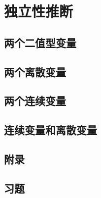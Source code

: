 \chapter{独立性推断}

\section{两个二值型变量}

\pending

\section{两个离散变量}

\pending

\section{两个连续变量}

\pending

\section{连续变量和离散变量}

\pending

\section{附录}

\pending

\section{习题}

\pending
